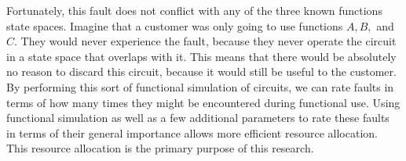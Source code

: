 Fortunately, this fault does not conflict with any of the three known functions state spaces.
Imagine that a customer was only going to use functions $A, B,$ and $C$.
They would never experience the fault, because they never operate the circuit in a state space that overlaps with it. 
This means that there would be absolutely no reason to discard this circuit, because it would still be useful to the customer. 
By performing this sort of functional simulation of circuits, we can rate faults in terms of how many times they might be encountered during functional use.
Using functional simulation as well as a few additional parameters to rate these faults in terms of their general importance allows  more efficient resource allocation. 
This resource allocation is the primary purpose of this research. 